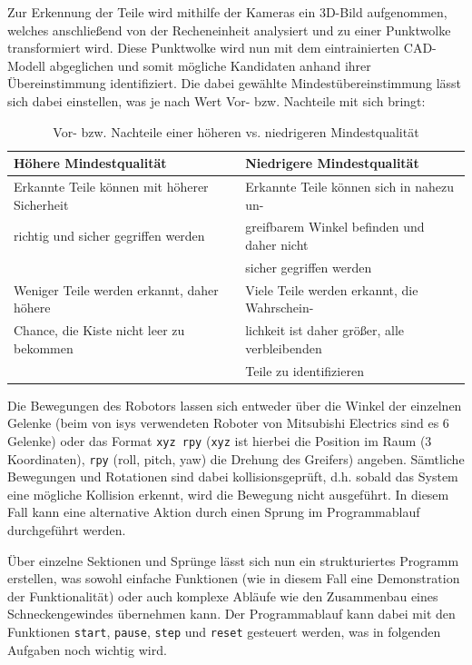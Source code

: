 Zur Erkennung der Teile wird mithilfe der Kameras ein 3D-Bild aufgenommen, welches
anschließend von der Recheneinheit analysiert und zu einer Punktwolke transformiert
wird. Diese Punktwolke wird nun mit dem eintrainierten CAD-Modell abgeglichen und
somit mögliche Kandidaten anhand ihrer Übereinstimmung identifiziert. Die dabei
gewählte Mindestübereinstimmung lässt sich dabei einstellen, was je nach Wert
Vor- bzw. Nachteile mit sich bringt:

\begin{table}[H]
	\begin{tabular}{| l || l |}
	\hline
	\textbf{Höhere Mindestqualität} & \textbf{ Niedrigere Mindestqualität}\\
	\hline\hline
	Erkannte Teile können mit höherer Sicherheit & Erkannte Teile können sich in nahezu un-\\
	richtig und sicher gegriffen werden & greifbarem Winkel befinden und daher nicht\\
	& sicher gegriffen werden\\
	\hline
	Weniger Teile werden erkannt, daher höhere & Viele Teile werden erkannt, die Wahrschein-\\
	Chance, die Kiste nicht leer zu bekommen & lichkeit ist daher größer, alle verbleibenden\\
	& Teile zu identifizieren\\
	\hline
	\end{tabular}
	\caption{Vor- bzw. Nachteile einer höheren vs. niedrigeren Mindestqualität}
	\label{mikado-demo-mindestqualität}
\end{table}

Die Bewegungen des Robotors lassen sich entweder über die Winkel der einzelnen Gelenke
(beim von isys verwendeten Roboter von Mitsubishi Electrics sind es 6 Gelenke) oder
das Format \texttt{xyz rpy} (\texttt{xyz} ist hierbei die Position im Raum (3 Koordinaten),
\texttt{rpy} (roll, pitch, yaw) die Drehung des Greifers) angeben. Sämtliche Bewegungen
und Rotationen sind dabei kollisionsgeprüft, d.h. sobald das System eine mögliche
Kollision erkennt, wird die Bewegung nicht ausgeführt. In diesem Fall kann eine
alternative Aktion durch einen Sprung im Programmablauf durchgeführt werden.

Über einzelne Sektionen und Sprünge lässt sich nun ein strukturiertes Programm erstellen,
was sowohl einfache Funktionen (wie in diesem Fall eine Demonstration der Funktionalität)
oder auch komplexe Abläufe wie den Zusammenbau eines Schneckengewindes übernehmen
kann. Der Programmablauf kann dabei mit den Funktionen \texttt{start}, \texttt{pause},
\texttt{step} und \texttt{reset} gesteuert werden, was in folgenden Aufgaben noch
wichtig wird.

